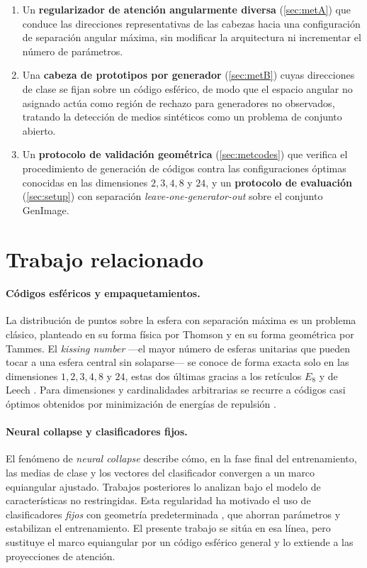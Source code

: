 \documentclass[11pt,a4paper]{article}
\theoremstyle{plain}
\begin{document}
\begin{enumerate}
\item Un \textbf{regularizador de atención angularmente diversa}
(\cref{sec:metA}) que conduce las direcciones representativas de las
cabezas hacia una configuración de separación angular máxima, sin
modificar la arquitectura ni incrementar el número de parámetros.
\item Una \textbf{cabeza de prototipos por generador}
(\cref{sec:metB}) cuyas direcciones de clase se fijan sobre un código
esférico, de modo que el espacio angular no asignado actúa como región
de rechazo para generadores no observados, tratando la detección de
medios sintéticos como un problema de conjunto abierto.
\item Un \textbf{protocolo de validación geométrica}
(\cref{sec:metcodes}) que verifica el procedimiento de generación de
códigos contra las configuraciones óptimas conocidas en las dimensiones
$2,3,4,8$ y $24$, y un \textbf{protocolo de evaluación}
(\cref{sec:setup}) con separación \emph{leave-one-generator-out} sobre
el conjunto GenImage.
\end{enumerate}

\section{Trabajo relacionado}
\label{sec:related}

\paragraph{Códigos esféricos y empaquetamientos.}
La distribución de puntos sobre la esfera con separación máxima es un
problema clásico, planteado en su forma física por Thomson y en su forma
geométrica por Tammes. El \emph{kissing number} ---el mayor número de
esferas unitarias que pueden tocar a una esfera central sin solaparse---
se conoce de forma exacta solo en las dimensiones $1,2,3,4,8$ y $24$,
estas dos últimas gracias a los retículos $E_8$ y de Leech
\cite{conway1999}. Para dimensiones y cardinalidades arbitrarias se
recurre a códigos casi óptimos obtenidos por minimización de energías de
repulsión \cite{saff1997}.

\paragraph{Neural collapse y clasificadores fijos.}
El fenómeno de \emph{neural collapse} \cite{papyan2020} describe cómo,
en la fase final del entrenamiento, las medias de clase y los vectores
del clasificador convergen a un marco equiangular ajustado. Trabajos
posteriores \cite{zhu2021} lo analizan bajo el modelo de
características no restringidas. Esta regularidad ha motivado el uso de
clasificadores \emph{fijos} con geometría predeterminada
\cite{pernici2021}, que ahorran parámetros y estabilizan el
entrenamiento. El presente trabajo se sitúa en esa línea, pero sustituye
el marco equiangular por un código esférico general y lo extiende a las
proyecciones de atención.
\end{document}
